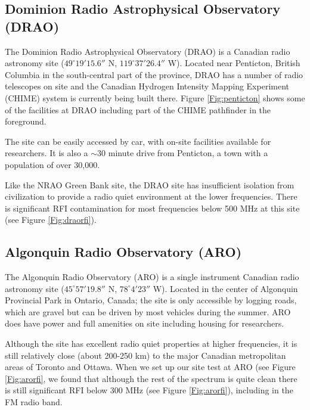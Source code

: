 \subsection{Dominion Radio Astrophysical Observatory (DRAO)}

The Dominion Radio Astrophysical Observatory (DRAO) is a Canadian radio astronomy site ($49^\circ 19' 15.6''$ N, $119^\circ 37' 26.4''$ W). Located near Penticton, British Columbia in the south-central part of the province, DRAO has a number of radio telescopes on site and the Canadian Hydrogen Intensity Mapping Experiment (CHIME) system is currently being built there. Figure \ref{Fig:penticton} shows some of the facilities at DRAO including part of the CHIME pathfinder in the foreground. 

The site can be easily accessed by car, with on-site facilities available for researchers. It is also a $\sim$30 minute drive from Penticton, a town with a population of over 30,000. 

Like the NRAO Green Bank site, the DRAO site has insufficient isolation from civilization to provide a radio quiet environment at the lower frequencies. There is significant RFI contamination for most frequencies below 500 MHz at this site (see Figure \ref{Fig:draorfi}).  

\subsection{Algonquin Radio Observatory (ARO)}

The Algonquin Radio Observatory (ARO) is a single instrument Canadian radio astronomy site ($45^\circ 57' 19.8''$ N, $78^\circ 4' 23''$ W). Located in the center of Algonquin Provincial Park in Ontario, Canada; the site is only accessible by logging roads, which are gravel but can be driven by most vehicles during the summer. ARO does have power and full amenities on site including housing for researchers. 

Although the site has excellent radio quiet properties at higher frequencies, it is still relatively close (about 200-250 km) to the major Canadian metropolitan areas of Toronto and Ottawa. When we set up our site test at ARO (see Figure \ref{Fig:arorfi}, we found that although the rest of the spectrum is quite clean there is still significant RFI below 300 MHz (see Figure \ref{Fig:arorfi}), including in the FM radio band. 


